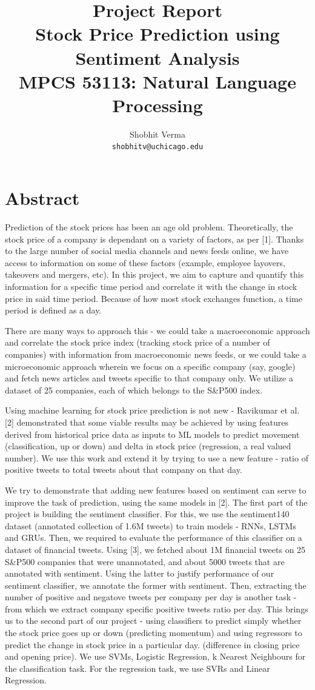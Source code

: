 \documentclass{article}
\title{Project Report\\Stock Price Prediction using Sentiment Analysis\\ MPCS 53113: Natural Language Processing}
\author{Shobhit Verma \\ \texttt{shobhitv@uchicago.edu}}
\begin{document}
\maketitle

\section{Abstract}
Prediction of the stock prices has been an age old problem. Theoretically, the stock price of a company is dependant on a variety of factors, as per [1]. Thanks to the large number of social media channels and news feeds online, we have access to information on some of these factors (example, employee layovers, takeovers and mergers, etc). In this project, we aim to capture and quantify this information for a specific time period and correlate it with the change in stock price in said time period. Because of how most stock exchanges function, a time period is defined as a day. 

There are many ways to approach this - we could take a macroeconomic approach and correlate the stock price index (tracking stock price of a number of companies) with information from macroeconomic news feeds, or we could take a microeconomic approach wherein we focus on a specific company (say, google) and fetch news articles and tweets specific to that company only. We utilize a dataset of 25 companies, each of which belongs to the S\&P500 index. 

Using machine learning for stock price prediction is not new - Ravikumar et al. [2] demonstrated that some viable results may be achieved by using features derived from historical price data as inputs to ML models to predict movement (classification, up or down) and delta in stock price (regression, a real valued number). We use this work and extend it by trying to use a new feature - ratio of positive tweets to total tweets about that company on that day.

We try to demonstrate that adding new features based on sentiment can serve to improve the task of prediction, using the same models in [2]. The first part of the project is building the sentiment classifier. For this, we use the sentiment140 dataset (annotated collection of 1.6M tweets) to train models - RNNs, LSTMs and GRUs. Then, we required to evaluate the performance of this classifier on a dataset of financial tweets. Using [3], we fetched about 1M financial tweets on 25 S\&P500 companies that were unannotated, and about 5000 tweets that are annotated with sentiment. Using the latter to justify performance of our sentiment classifier, we annotate the former with sentiment. Then, extracting the number of positive and negatove tweets per company per day is another task - from which we extract company specific positive tweets ratio per day.
This brings us to the second part of our project - using classifiers to predict simply whether the stock price goes up or down (predicting momentum) and using regressors to predict the change in stock price in a particular day. (difference in closing price and opening price). We use SVMs, Logistic Regression, k Nearest Neighbours for the classification task. For the regression task, we use SVRs and Linear Regression.
\end{document}
